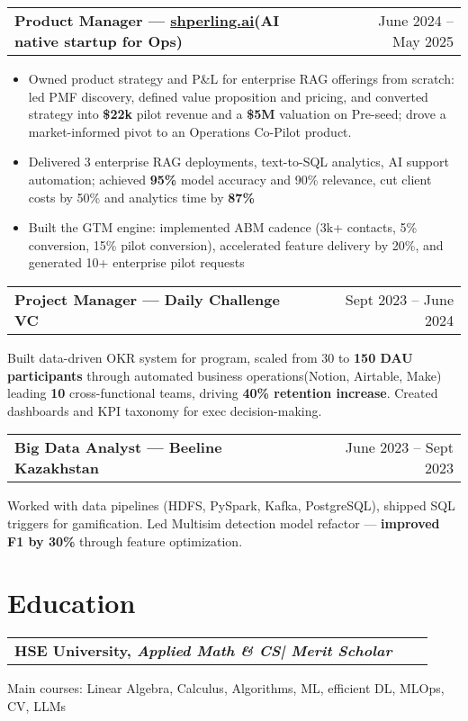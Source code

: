 \documentclass[a4paper,12pt]{article}
\makeatletter
\newenvironment{jobshort}[2]
    {
    \begin{tabularx}{\linewidth}{@{}l X r@{}}
    \textbf{#1} & \hfill &  #2 \\[0.25pt]
    \end{tabularx}
    }
    {
    }
\newenvironment{joblong}[2]
    {
    \begin{tabularx}{\linewidth}{@{}l X r@{}}
    \textbf{#1} & \hfill &  #2 \\[0.25pt]
    \end{tabularx}
    \begin{minipage}[t]{\linewidth}
    \begin{itemize}[leftmargin=1em,label=--]
    }
    {
    \end{itemize}
    \end{minipage}    
    }
\makeatother
\begin{document}
\begin{joblong}{Product Manager — \href{https://shperling.ai}{shperling.ai}(AI native startup for Ops)}{June 2024 – May 2025}
\item Owned product strategy and P\&L for enterprise RAG offerings from scratch: led PMF discovery, defined value proposition and pricing, and converted strategy into \textbf{\$22k} pilot revenue and a \textbf{\$5M} valuation on Pre-seed; drove a market-informed pivot to an Operations Co-Pilot product.
\item Delivered 3 enterprise RAG deployments, text-to-SQL analytics, AI support automation; achieved \textbf{95\%} model accuracy and 90\% relevance, cut client costs by 50\+\% and analytics time by \textbf{87\%}
\item Built the GTM engine: implemented ABM cadence (3k+ contacts, 5\% conversion, 15\% pilot conversion), accelerated feature delivery by 20\%, and generated 10+ enterprise pilot requests
\end{joblong}


\begin{jobshort}{Project Manager — Daily Challenge VC}{Sept 2023 – June 2024}
Built data-driven OKR system for program, scaled from 30 to \textbf{150 DAU participants} through automated business operations(Notion, Airtable, Make) leading \textbf{10} cross-functional teams, driving \textbf{40\% retention increase}. Created dashboards and KPI taxonomy for exec decision-making.
\end{jobshort}


\begin{jobshort}{Big Data Analyst — Beeline Kazakhstan}{June 2023 – Sept 2023}
Worked with data pipelines (HDFS, PySpark, Kafka, PostgreSQL), shipped SQL triggers for gamification. Led Multisim detection model refactor — \textbf{improved F1 by 30\%} through feature optimization.
\end{jobshort}
\section{Education}
\begin{jobshort}{HSE University, \textit{Applied Math \& CS| Merit Scholar}}{}
\end{jobshort}
\noindent Main courses: Linear Algebra, Calculus, Algorithms, ML, efficient DL, MLOps, CV, LLMs
\end{document}
